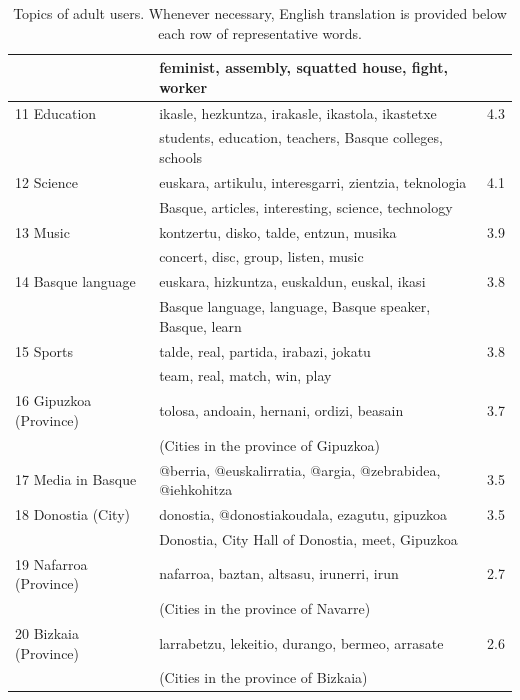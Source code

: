 \documentclass[information,article,submit,moreauthors,pdftex,10pt,a4paper]{Definitions/mdpi}
\begin{document}
\begin{table}[H]
\begin{tabular}{llc}
                   & feminist, assembly, squatted house, fight, worker & \\ \hline
                   11 Education & ikasle, hezkuntza, irakasle, ikastola, ikastetxe & 4.3 \\
                   & students, education, teachers, Basque colleges, schools & \\ \hline
                   12 Science & euskara, artikulu, interesgarri, zientzia, teknologia & 4.1 \\
                   &  Basque, articles, interesting, science, technology& \\ \hline
                   13 Music & kontzertu, disko, talde, entzun, musika & 3.9 \\
                   & concert, disc, group, listen, music & \\ \hline
                   14 Basque language & euskara, hizkuntza, euskaldun, euskal, ikasi & 3.8 \\
                   & Basque language, language, Basque speaker, Basque, learn & \\ \hline
                   15 Sports & talde, real, partida, irabazi, jokatu & 3.8 \\
                   & team, real, match, win, play & \\ \hline
                   16 Gipuzkoa (Province) & tolosa, andoain, hernani, ordizi, beasain & 3.7  \\ & (Cities in the province of Gipuzkoa) & \\ \hline
                   17 Media in Basque & @berria, @euskalirratia, @argia, @zebrabidea, @iehkohitza & 3.5  \\ \hline
                   18 Donostia (City) & donostia, @donostiakoudala, ezagutu, gipuzkoa & 3.5 \\ & Donostia, City Hall of Donostia, meet, Gipuzkoa & \\ \hline
                   19 Nafarroa (Province) & nafarroa, baztan, altsasu, irunerri, irun & 2.7  \\ & (Cities in the province of Navarre) & \\ \hline
                   20 Bizkaia (Province) & larrabetzu, lekeitio, durango, bermeo, arrasate & 2.6 \\ & (Cities in the province of Bizkaia) & \\ \hline
  \end{tabular}
  \caption{Topics of adult users. Whenever necessary, English translation is provided below each row of representative words.}
  \label{tab:adult-tp}
\end{table}
\end{document}
